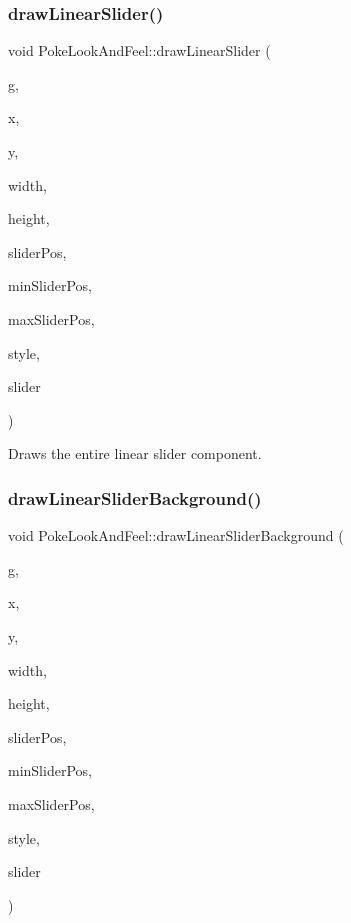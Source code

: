 \subsubsection{\texorpdfstring{draw\+Linear\+Slider()}{drawLinearSlider()}}
{\footnotesize\ttfamily void Poke\+Look\+And\+Feel\+::draw\+Linear\+Slider (\begin{DoxyParamCaption}\item[{Graphics \&}]{g,  }\item[{int}]{x,  }\item[{int}]{y,  }\item[{int}]{width,  }\item[{int}]{height,  }\item[{float}]{slider\+Pos,  }\item[{float}]{min\+Slider\+Pos,  }\item[{float}]{max\+Slider\+Pos,  }\item[{const Slider\+::\+Slider\+Style}]{style,  }\item[{Slider \&}]{slider }\end{DoxyParamCaption})\hspace{0.3cm}{\ttfamily [override]}}

Draws the entire linear slider component. \mbox{\label{classPokeLookAndFeel_ab1421aeb40fd8d2126e7497e85c2a331}} 
\subsubsection{\texorpdfstring{draw\+Linear\+Slider\+Background()}{drawLinearSliderBackground()}}
{\footnotesize\ttfamily void Poke\+Look\+And\+Feel\+::draw\+Linear\+Slider\+Background (\begin{DoxyParamCaption}\item[{Graphics \&}]{g,  }\item[{int}]{x,  }\item[{int}]{y,  }\item[{int}]{width,  }\item[{int}]{height,  }\item[{float}]{slider\+Pos,  }\item[{float}]{min\+Slider\+Pos,  }\item[{float}]{max\+Slider\+Pos,  }\item[{const Slider\+::\+Slider\+Style}]{style,  }\item[{Slider \&}]{slider }\end{DoxyParamCaption})\hspace{0.3cm}{\ttfamily [override]}}

